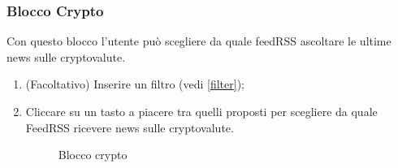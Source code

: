\subsubsection{Blocco Crypto}
Con questo blocco l'utente può scegliere da quale feedRSS ascoltare le ultime news sulle cryptovalute.
\begin{enumerate}
	\item (Facoltativo) Inserire un filtro (vedi \ref{filter});
	\newpage
	\item Cliccare su un tasto a piacere tra quelli proposti per scegliere da quale FeedRSS ricevere news sulle cryptovalute.
\begin{figure}[!ht]
	\centering
	\caption{Blocco crypto}
\end{figure}
\end{enumerate}
\newpage
